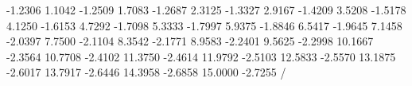    -1.2306
    1.1042   -1.2509
    1.7083   -1.2687
    2.3125   -1.3327
    2.9167   -1.4209
    3.5208   -1.5178
    4.1250   -1.6153
    4.7292   -1.7098
    5.3333   -1.7997
    5.9375   -1.8846
    6.5417   -1.9645
    7.1458   -2.0397
    7.7500   -2.1104
    8.3542   -2.1771
    8.9583   -2.2401
    9.5625   -2.2998
   10.1667   -2.3564
   10.7708   -2.4102
   11.3750   -2.4614
   11.9792   -2.5103
   12.5833   -2.5570
   13.1875   -2.6017
   13.7917   -2.6446
   14.3958   -2.6858
   15.0000   -2.7255
/\relax
